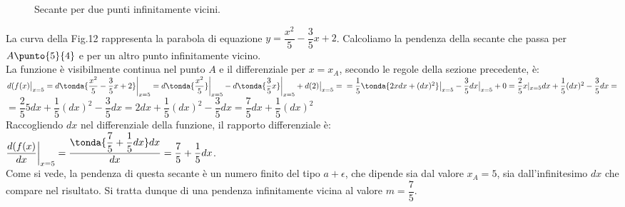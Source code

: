 \begin{figure}[h]
\begin{inaccessibleblock}
 \begin{center}
\secRD
 \end{center}
\end{inaccessibleblock}
\caption{Secante per due punti infinitamente vicini.} 
\label{fig:diff01_tangente}
\end{figure}

\begin{esempio}
  \label{esempio:diff01_mdiff}
  La curva della Fig.12 rappresenta la parabola di equazione 
  $y=\dfrac{x^2}{5}-\dfrac{3}{5}x+2$. Calcoliamo la pendenza della secante 
che
  passa per $A\punto{5}{4}$ e per un altro punto infinitamente vicino.\\
  La funzione è visibilmente continua nel punto $A$ e il differenziale per 
  $x=x_A$, secondo le regole della sezione precedente, è:\\ 
  $d(f(x)\big|_{x=5}=d\tonda{\dfrac{x^2}{5}-\dfrac{3}{5}x+2}\bigg|_{x=5}=
  d\tonda{\dfrac{x^2}{5}}\bigg|_{x=5}-d\tonda{\dfrac{3}{5}x}\bigg|_{x=5}+
  d(2)\big|_{x=5}=\\
  =\dfrac{1}{5}\tonda{2xdx+(dx)^2}\big|_{x=5}-\dfrac{3}{5}dx\big|_{x=5}+0=
  \dfrac{2}{5}x|_{x=5}dx+\dfrac{1}{5}(dx)^2-\dfrac{3}{5}dx=$\\
  $=\dfrac{2}{5}5dx+\dfrac{1}{5}(dx)^2-\dfrac{3}{5}dx=
  2dx+\dfrac{1}{5}(dx)^2-\dfrac{3}{5}dx=
  \dfrac{7}{5}dx+\dfrac{1}{5}(dx)^2$\\
  Raccogliendo $dx$ nel differenziale della funzione, il rapporto 
differenziale 
  è:\\
  
$\dfrac{d(f(x)}{dx}\bigg|_{x=5}=\dfrac{\tonda{\dfrac{7}{5}+\dfrac{1}{5}dx}dx
}
  {dx}=\dfrac{7}{5}+\dfrac{1}{5}dx$.\\
  Come si vede, la pendenza di questa secante è un numero finito del tipo 
  $a+\epsilon$, che dipende sia dal valore $x_A=5$, sia dall'infinitesimo 
  $dx$ che compare nel risultato. Si tratta dunque di una pendenza 
  infinitamente vicina al valore $m=\dfrac{7}{5}$.
\end{esempio}

